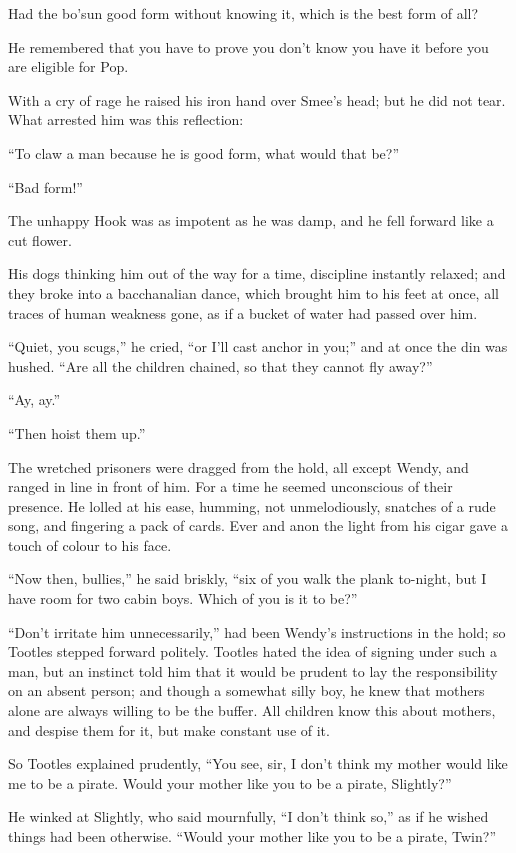Had the bo'sun good form without knowing it, which is the best form of
all?

He remembered that you have to prove you don't know you have it before
you are eligible for Pop.

With a cry of rage he raised his iron hand over Smee's head; but he did
not tear. What arrested him was this reflection:

``To claw a man because he is good form, what would that be?''

``Bad form!''

The unhappy Hook was as impotent as he was damp, and he fell forward
like a cut flower.

His dogs thinking him out of the way for a time, discipline instantly
relaxed; and they broke into a bacchanalian dance, which brought him to
his feet at once, all traces of human weakness gone, as if a bucket of
water had passed over him.

``Quiet, you scugs,'' he cried, ``or I'll cast anchor in you;'' and at once
the din was hushed. ``Are all the children chained, so that they cannot
fly away?''

``Ay, ay.''

``Then hoist them up.''

The wretched prisoners were dragged from the hold, all except Wendy,
and ranged in line in front of him. For a time he seemed unconscious of
their presence. He lolled at his ease, humming, not unmelodiously,
snatches of a rude song, and fingering a pack of cards. Ever and anon
the light from his cigar gave a touch of colour to his face.

``Now then, bullies,'' he said briskly, ``six of you walk the plank
to-night, but I have room for two cabin boys. Which of you is it to
be?''

``Don't irritate him unnecessarily,'' had been Wendy's instructions in
the hold; so Tootles stepped forward politely. Tootles hated the idea
of signing under such a man, but an instinct told him that it would be
prudent to lay the responsibility on an absent person; and though a
somewhat silly boy, he knew that mothers alone are always willing to be
the buffer. All children know this about mothers, and despise them for
it, but make constant use of it.

So Tootles explained prudently, ``You see, sir, I don't think my mother
would like me to be a pirate. Would your mother like you to be a
pirate, Slightly?''

He winked at Slightly, who said mournfully, ``I don't think so,'' as if
he wished things had been otherwise. ``Would your mother like you to be
a pirate, Twin?''

